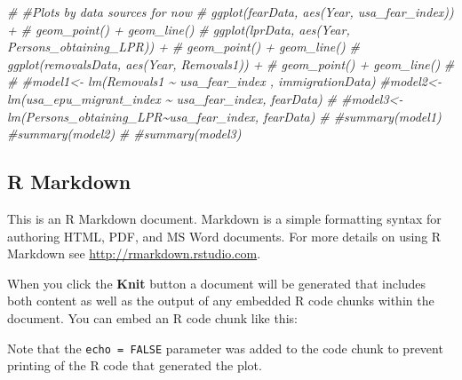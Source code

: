\documentclass[
]{article}
\newenvironment{Shaded}{\begin{snugshade}}{\end{snugshade}}
\newcommand{\AttributeTok}[1]{\textcolor[rgb]{0.13,0.29,0.53}{#1}}
\newcommand{\CommentTok}[1]{\textcolor[rgb]{0.56,0.35,0.01}{\textit{#1}}}
\newcommand{\DecValTok}[1]{\textcolor[rgb]{0.00,0.00,0.81}{#1}}
\newcommand{\FunctionTok}[1]{\textcolor[rgb]{0.13,0.29,0.53}{\textbf{#1}}}
\newcommand{\NormalTok}[1]{#1}
\newcommand{\OtherTok}[1]{\textcolor[rgb]{0.56,0.35,0.01}{#1}}
\newcommand{\SpecialCharTok}[1]{\textcolor[rgb]{0.81,0.36,0.00}{\textbf{#1}}}
\newcommand{\StringTok}[1]{\textcolor[rgb]{0.31,0.60,0.02}{#1}}
\begin{document}
\begin{Shaded}
\end{Shaded}

\begin{Shaded}
\begin{Highlighting}[]
\CommentTok{\# \#Plots by data sources for now}
\CommentTok{\# ggplot(fearData, aes(Year, usa\_fear\_index)) + }
\CommentTok{\#   geom\_point() + geom\_line()}
\CommentTok{\# ggplot(lprData, aes(Year, Persons\_obtaining\_LPR)) + }
\CommentTok{\#   geom\_point() + geom\_line()}
\CommentTok{\# ggplot(removalsData, aes(Year, Removals1)) + }
\CommentTok{\#   geom\_point() + geom\_line()}
\CommentTok{\# }
\CommentTok{\# \#model1\textless{}{-} lm(Removals1 \textasciitilde{} usa\_fear\_index , immigrationData)}
\CommentTok{\#model2\textless{}{-} lm(usa\_epu\_migrant\_index \textasciitilde{} usa\_fear\_index, fearData)}
\CommentTok{\# \#model3\textless{}{-} lm(Persons\_obtaining\_LPR\textasciitilde{}usa\_fear\_index, fearData)}
\CommentTok{\# \#summary(model1)}
\CommentTok{\#summary(model2)}
\CommentTok{\# \#summary(model3)}
\end{Highlighting}
\end{Shaded}

\hypertarget{r-markdown}{%
\subsection{R Markdown}\label{r-markdown}}

This is an R Markdown document. Markdown is a simple formatting syntax
for authoring HTML, PDF, and MS Word documents. For more details on
using R Markdown see \url{http://rmarkdown.rstudio.com}.

When you click the \textbf{Knit} button a document will be generated
that includes both content as well as the output of any embedded R code
chunks within the document. You can embed an R code chunk like this:

Note that the \texttt{echo\ =\ FALSE} parameter was added to the code
chunk to prevent printing of the R code that generated the plot.
\end{document}
